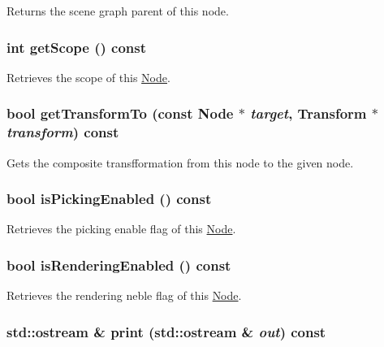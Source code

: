 Returns the scene graph parent of this node. \hypertarget{classm3g_1_1Node_a3c291c19cf805338fa4ad3c3deb663a}{
\subsubsection[{getScope}]{\setlength{\rightskip}{0pt plus 5cm}int getScope () const}}
\label{classm3g_1_1Node_a3c291c19cf805338fa4ad3c3deb663a}


Retrieves the scope of this \hyperlink{classm3g_1_1Node}{Node}. \hypertarget{classm3g_1_1Node_0dd162e8412d8589b27ee03d798189a6}{
\subsubsection[{getTransformTo}]{\setlength{\rightskip}{0pt plus 5cm}bool getTransformTo (const {\bf Node} $\ast$ {\em target}, \/  {\bf Transform} $\ast$ {\em transform}) const}}
\label{classm3g_1_1Node_0dd162e8412d8589b27ee03d798189a6}


Gets the composite transfformation from this node to the given node. \hypertarget{classm3g_1_1Node_b3187e5056afa4a94af03e34125c86b1}{
\subsubsection[{isPickingEnabled}]{\setlength{\rightskip}{0pt plus 5cm}bool isPickingEnabled () const}}
\label{classm3g_1_1Node_b3187e5056afa4a94af03e34125c86b1}


Retrieves the picking enable flag of this \hyperlink{classm3g_1_1Node}{Node}. \hypertarget{classm3g_1_1Node_95020b155afed9552cc55377b09b1e86}{
\subsubsection[{isRenderingEnabled}]{\setlength{\rightskip}{0pt plus 5cm}bool isRenderingEnabled () const}}
\label{classm3g_1_1Node_95020b155afed9552cc55377b09b1e86}


Retrieves the rendering neble flag of this \hyperlink{classm3g_1_1Node}{Node}. \hypertarget{classm3g_1_1Node_6fea17fa1532df3794f8cb39cb4f911f}{
\subsubsection[{print}]{\setlength{\rightskip}{0pt plus 5cm}std::ostream \& print (std::ostream \& {\em out}) const}}
\label{classm3g_1_1Node_6fea17fa1532df3794f8cb39cb4f911f}


